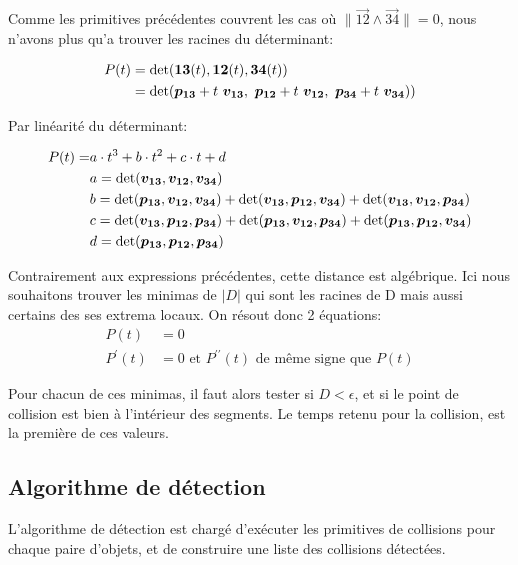 \documentclass[11pt,class=article,float=false,crop=false]{standalone}
\begin{document}
Comme les primitives précédentes couvrent les cas où $\|\vec{12} \wedge \vec{34}\| = 0$, nous n'avons plus qu'a trouver les racines du déterminant:

\begin{align}
	P(t) &= \operatorname{det}(\bm{13}(t), \bm{12}(t), \bm{34}(t)) \\
	&= \operatorname{det}(\bm{p_{13}}+t~\bm{v_{13}},~ \bm{p_{12}}+t~\bm{v_{12}},~\bm{p_{34}}+t~\bm{v_{34}}))
\end{align}

Par linéarité du déterminant:

\begin{align}
	P(t) =& a\cdot t^3 + b\cdot t^2 + c\cdot t + d \\
	& a = \operatorname{det}(\bm{v_{13}},\bm{v_{12}},\bm{v_{34}})\\
	& b = \operatorname{det}(\bm{p_{13}},\bm{v_{12}},\bm{v_{34}}) 
	+ \operatorname{det}(\bm{v_{13}},\bm{p_{12}},\bm{v_{34}}) 
	+ \operatorname{det}(\bm{v_{13}},\bm{v_{12}},\bm{p_{34}})\\
	& c = \operatorname{det}(\bm{v_{13}},\bm{p_{12}},\bm{p_{34}}) 
	+ \operatorname{det}(\bm{p_{13}},\bm{v_{12}},\bm{p_{34}}) 
	+ \operatorname{det}(\bm{p_{13}},\bm{p_{12}},\bm{v_{34}})\\
	& d = \operatorname{det}(\bm{p_{13}},\bm{p_{12}},\bm{p_{34}})
\end{align}

Contrairement aux expressions précédentes, cette distance est algébrique. Ici nous souhaitons trouver les minimas de $|D|$ qui sont les racines de D mais aussi certains des ses extrema locaux. On résout donc 2 équations: 
\begin{align}
	P(t) &= 0 \\
	P^\prime (t) &= 0 \text{ et } P^{\prime\prime} (t) \text{ de même signe que } P(t) 
\end{align}

Pour chacun de ces minimas, il faut alors tester si $D < \epsilon$, et si le point de collision est bien à l'intérieur des segments. Le temps retenu pour la collision, est la première de ces valeurs.

\subsection{Algorithme de détection}
L'algorithme de détection est chargé d'exécuter les primitives de collisions pour chaque paire d'objets, et de construire une liste des collisions détectées. 
\end{document}
